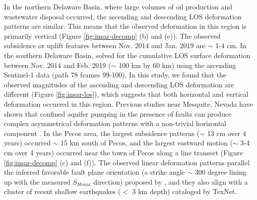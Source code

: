 In the northern Delaware Basin, where large volumes of oil production and wastewater disposal occurred, the ascending and descending LOS deformation patterns are similar. This means that the observed deformation in this region is primarily vertical (Figure \ref{fig:insar-decomp} (b) and (e)). The observed subsidence or uplift features between Nov. 2014 and Jan. 2019 are $\sim$ 1-4 cm. In the southern Delaware Basin, \cite{Deng2020SurfaceDeformationInduced} solved for the cumulative LOS surface deformation between Nov. 2014 and Feb. 2019 ($\sim$ 100 km by 60 km) using the ascending Sentinel-1 data (path 78 frames 99-100). In this study, we found that the observed magnitudes of the ascending and descending LOS deformation are different (Figure \ref{fig:insar-los}), which suggests that both horizontal and vertical deformation occurred in this region. Previous studies near Mesquite, Nevada have shown that confined aquifer pumping in the presence of faults can produce complex asymmetrical deformation patterns with a non-trivial horizontal component \citep{Burbey2008InfluenceGeologicStructures}. In the Pecos area, the largest subsidence patterns ($\sim$ 13 cm over 4 years) occurred $\sim$ 15 km south of Pecos, and the largest eastward motion ($\sim$ 3-4 cm over 4 years) occurred near the town of Pecos along a line transect (Figure \ref{fig:insar-decomp} (c) and (f)). The observed linear deformation patterns parallel the inferred favorable fault plane orientation (a strike angle $\sim$ 300 degree lining up with the measured $S_{Hmax}$ direction) proposed by \cite{LundSnee2018StateStressPermian}, and they also align with a cluster of recent shallow earthquakes ($<$ 3 km depth) cataloged by TexNet.



